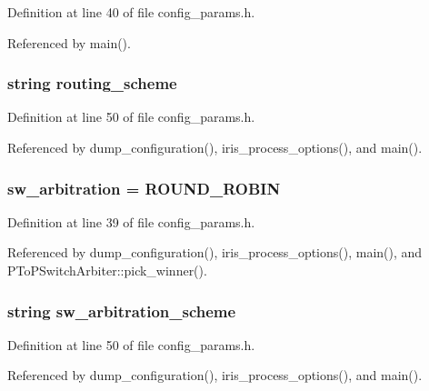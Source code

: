 Definition at line 40 of file config\_\-params.h.

Referenced by main().
\subsubsection[{routing\_\-scheme}]{\setlength{\rightskip}{0pt plus 5cm}string {\bf routing\_\-scheme}}\label{config__params_8h_1d8fde2528ed51a0d526ce2da4a9abe9}




Definition at line 50 of file config\_\-params.h.

Referenced by dump\_\-configuration(), iris\_\-process\_\-options(), and main().
\subsubsection[{sw\_\-arbitration}]{ {\bf sw\_\-arbitration} = ROUND\_\-ROBIN}\label{config__params_8h_045249e2273cf27331b1300b811640ba}




Definition at line 39 of file config\_\-params.h.

Referenced by dump\_\-configuration(), iris\_\-process\_\-options(), main(), and PToPSwitchArbiter::pick\_\-winner().
\subsubsection[{sw\_\-arbitration\_\-scheme}]{\setlength{\rightskip}{0pt plus 5cm}string {\bf sw\_\-arbitration\_\-scheme}}\label{config__params_8h_6b09ad0b056b01acb9e4449502e407bb}




Definition at line 50 of file config\_\-params.h.

Referenced by dump\_\-configuration(), iris\_\-process\_\-options(), and main().
